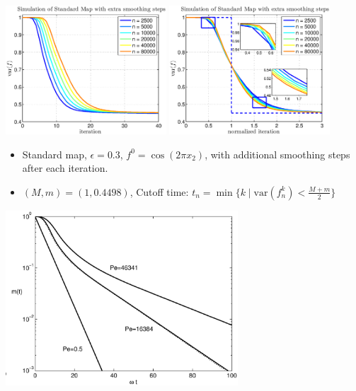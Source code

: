 \documentclass[12pt,t]{beamer}
\begin{document}
\begin{frame}
\begin{center}
\includegraphics[width=0.45\textwidth,trim=1cm 1cm 0cm 0cm]{standardmapcutoffwithsmoothing}
\includegraphics[width=0.45\textwidth,trim=1cm 1cm 0cm 0cm]{standardmapcutoffwithsmoothingn}
\end{center}

\begin{itemize}
\item Standard map, $\epsilon = 0.3$, $f^0 = \cos(2\pi x_2)$, with additional smoothing steps after each iteration.
\item $(M,m) = (1,0.4498)$, Cutoff time: $t_n =\min \{ k \mid \text{var}(f^k_n)< \frac{M+m}{2}\} $
\end{itemize}

\end{frame}


\begin{frame}
\begin{center}
\includegraphics[width=0.65\textwidth]{Glessonstandardmap}
\end{center}
\end{frame}
\end{document}
